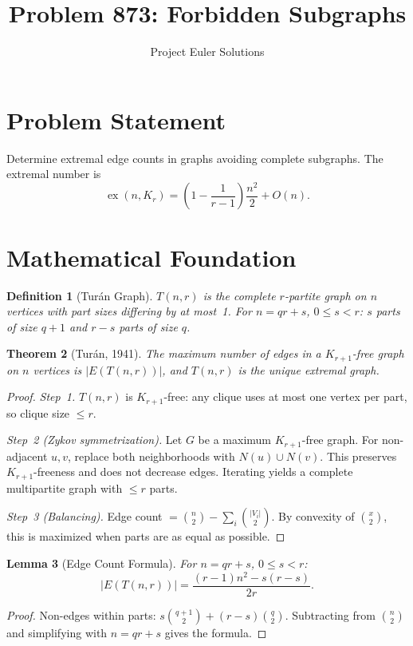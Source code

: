 \documentclass[11pt]{article}
\title{Problem 873: Forbidden Subgraphs}
\author{Project Euler Solutions}
\date{}
\newtheorem{theorem}{Theorem}
\newtheorem{lemma}[theorem]{Lemma}
\newtheorem{definition}[theorem]{Definition}
\begin{document}
\maketitle

\section{Problem Statement}

Determine extremal edge counts in graphs avoiding complete subgraphs. The extremal number is
\[
\operatorname{ex}(n, K_r) = \left(1 - \frac{1}{r-1}\right)\frac{n^2}{2} + O(n).
\]

\section{Mathematical Foundation}

\begin{definition}[Tur\'an Graph]
$T(n,r)$ is the complete $r$-partite graph on $n$ vertices with part sizes differing by at most~1. For $n = qr + s$, $0 \le s < r$: $s$ parts of size $q+1$ and $r-s$ parts of size $q$.
\end{definition}

\begin{theorem}[Tur\'an, 1941]
The maximum number of edges in a $K_{r+1}$-free graph on $n$ vertices is $|E(T(n,r))|$, and $T(n,r)$ is the unique extremal graph.
\end{theorem}

\begin{proof}
\emph{Step~1.} $T(n,r)$ is $K_{r+1}$-free: any clique uses at most one vertex per part, so clique size $\le r$.

\emph{Step~2 (Zykov symmetrization).} Let $G$ be a maximum $K_{r+1}$-free graph. For non-adjacent $u,v$, replace both neighborhoods with $N(u) \cup N(v)$. This preserves $K_{r+1}$-freeness and does not decrease edges. Iterating yields a complete multipartite graph with $\le r$ parts.

\emph{Step~3 (Balancing).} Edge count $= \binom{n}{2} - \sum_i \binom{|V_i|}{2}$. By convexity of $\binom{x}{2}$, this is maximized when parts are as equal as possible.
\end{proof}

\begin{lemma}[Edge Count Formula]
For $n = qr + s$, $0 \le s < r$:
\[
|E(T(n,r))| = \frac{(r-1)n^2 - s(r-s)}{2r}.
\]
\end{lemma}

\begin{proof}
Non-edges within parts: $s\binom{q+1}{2} + (r-s)\binom{q}{2}$. Subtracting from $\binom{n}{2}$ and simplifying with $n = qr + s$ gives the formula.
\end{proof}
\end{document}
